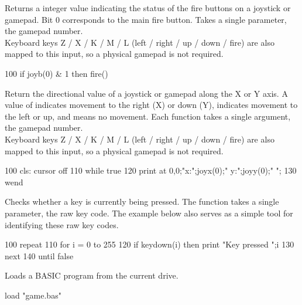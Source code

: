 \begin{entry}
Returns a integer value indicating the status of the fire buttons on a joystick or gamepad. Bit 0 corresponds to the main fire button. Takes a single parameter, the gamepad number.\\

Keyboard keys Z / X / K / M / L (left / right / up / down / fire) are also mapped to this input, so a physical gamepad is not required.

\begin{lstexample}
100 if joyb(0) & 1 then fire()
\end{lstexample}
\end{entry}

\begin{entry}
Return the directional value of a joystick or gamepad along the X or Y axis. A value of  indicates movement to the right (X) or down (Y),  indicates movement to the left or up, and  means no movement. Each function takes a single argument, the gamepad number.\\

Keyboard keys Z / X / K / M / L (left / right / up / down / fire) are also mapped to this input, so a physical gamepad is not required.

\begin{lstexample}
100   cls: cursor off 
110   while true 
120     print at 0,0;"x:";joyx(0);" y:";joyy(0);"  ";
130   wend 
\end{lstexample}
\end{entry}

\begin{entry}
Checks whether a key is currently being pressed. The function takes a single parameter, the raw key code. The example below also serves as a simple tool for identifying these raw key codes.

\begin{lstexample}
100 repeat
110   for i = 0 to 255
120     if keydown(i) then print "Key pressed ";i
130   next
140 until false
\end{lstexample}
\end{entry}

\begin{entry}
Loads a BASIC program from the current drive.

\begin{lstexample}
load "game.bas"
\end{lstexample}
\end{entry}

